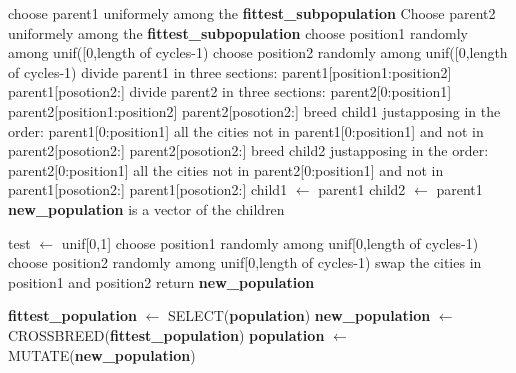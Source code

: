 \documentclass{article}
\begin{document}
\begin{algorithm}[H]
    \begin{algorithmic}[1]
  			\State choose parent1 uniformely among the \textbf{fittest\_subpopulation}
  			\State Choose parent2 uniformely among the \textbf{fittest\_subpopulation}
  				\State choose position1 randomly among unif([0,length of cycles-1)
  				\State choose position2 randomly among unif([0,length of cycles-1)
  				\State divide parent1 in three sections: 
  				\State parent1[position1:position2]
  				\State parent1[posotion2:]
  				\State divide parent2 in three sections:
  				\State parent2[0:position1] 
  				\State parent2[position1:position2]
  				\State parent2[posotion2:]
  				\State breed child1 justapposing in the order:
  				\State parent1[0:position1]
  				\State all the cities not in  parent1[0:position1] and not in parent2[posotion2:]
  				\State parent2[posotion2:]
  				\State breed child2 justapposing in the order:
  				\State parent2[0:position1]
  				\State all the cities not in  parent2[0:position1] and not in parent1[posotion2:]
  				\State parent1[posotion2:]
  			\Else
  				\State child1 $\leftarrow$ parent1
  				\State child2 $\leftarrow$ parent1
  			\EndIf
      	\EndFor
        \State \textbf{new\_population} is a vector of the children 
       \EndFunction
\end{algorithmic}
\end{algorithm}


\begin{algorithm}[H]
    \begin{algorithmic}[1]
        \State test $\leftarrow$ unif[0,1]
        	\State choose position1 randomly among unif[0,length of cycles-1)
  			\State choose position2 randomly among unif[0,length of cycles-1)
  			\State swap the cities in position1 and position2
        \EndIf
       \EndFor
        \State return \textbf{new\_population}
       \EndFunction
\end{algorithmic}
\end{algorithm}


\begin{algorithm}[H]
    \begin{algorithmic}[1]
        \State \textbf{fittest\_population} $\leftarrow$ SELECT(\textbf{population})
        \State \textbf{new\_population} $\leftarrow$ CROSSBREED(\textbf{fittest\_population})
       \State \textbf{population} $\leftarrow$ MUTATE(\textbf{new\_population})
       \EndFunction
\end{algorithmic}
\end{algorithm}
\end{document}

